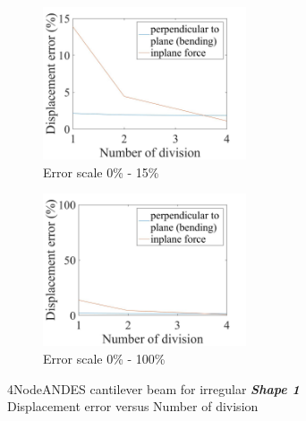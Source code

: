 \documentclass[fleqn,11pt]{article}
\begin{document}
\begin{figure}[H]
  \begin{subfigure}{0.5\textwidth}
    \centering
    \includegraphics[width=6cm]{../Figure-files/error4andes_beam_irregular_shape1.jpeg}
    \caption{Error scale 0\% - 15\%}
  \end{subfigure}
  \begin{subfigure}{0.5\textwidth}
    \centering
    \includegraphics[width=6cm]{../Figure-files/error4andes_beam_irregular_shape1100.jpeg}
    \caption{Error scale 0\% - 100\%}
  \end{subfigure}
  \captionsetup{justification=centering,margin=2cm}
  \caption{4NodeANDES cantilever beam for irregular \emph{\textbf{Shape 1}}\\
      Displacement error   versus   Number of division}
  \label{fig shape 1 4NodeANDES cantilever beam for irregular more elements}
\end{figure}


\end{document}
